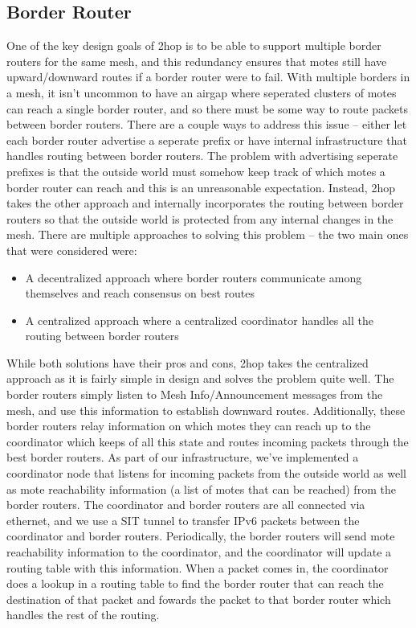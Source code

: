 \subsection{Border Router}
One of the key design goals of 2hop is to be able to support multiple border routers for the same mesh, and this redundancy ensures that motes still have upward/downward routes if a border router were to fail.
With multiple borders in a mesh, it isn't uncommon to have an airgap where seperated clusters of motes can reach a single border router, and so there must be some way to route packets between border routers.
There are a couple ways to address this issue -- either let each border router advertise a seperate prefix or have internal infrastructure that handles routing between border routers.
The problem with advertising seperate prefixes is that the outside world must somehow keep track of which motes a border router can reach and this is an unreasonable expectation.
Instead, 2hop takes the other approach and internally incorporates the routing between border routers so that the outside world is protected from any internal changes in the mesh.
There are multiple approaches to solving this problem -- the two main ones that were considered were:
\begin{itemize}
\item A decentralized approach where border routers communicate among themselves and reach consensus on best routes
\item A centralized approach where a centralized coordinator handles all the routing between border routers 
\end{itemize}
While both solutions have their pros and cons, 2hop takes the centralized approach as it is fairly simple in design and solves the problem quite well.
The border routers simply listen to Mesh Info/Announcement messages from the mesh, and use this information to establish downward routes.
Additionally, these border routers relay information on which motes they can reach up to the coordinator which keeps of all this state and routes incoming packets through the best border routers.
As part of our infrastructure, we've implemented a coordinator node that listens for incoming packets from the outside world as well as mote reachability information (a list of motes that can be reached) from the border routers. The coordinator and border routers are all connected via ethernet, and we use a SIT tunnel to transfer IPv6 packets between the coordinator and border routers. Periodically, the border routers will send mote reachability information to the coordinator, and the coordinator will update a routing table with this information. When a packet comes in, the coordinator does a lookup in a routing table to find the border router that can reach the destination of that packet and fowards the packet to that border router which handles the rest of the routing.

